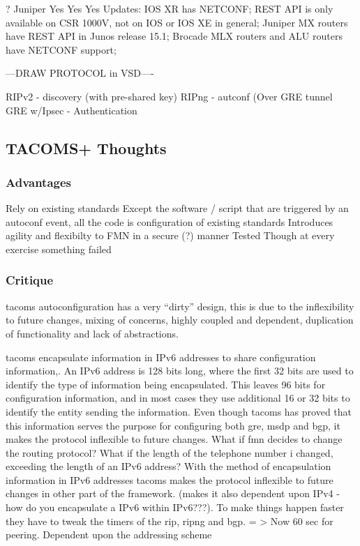 ?
Juniper
Yes
Yes
Yes
Updates:
IOS XR has NETCONF;
REST API is only available on CSR 1000V, not on IOS or IOS XE in general;
Juniper MX routers have REST API in Junos release 15.1;
Brocade MLX routers and ALU routers have NETCONF support;



---DRAW PROTOCOL in VSD----

RIPv2 - discovery (with pre-shared key)
RIPng - autconf (Over GRE tunnel 
GRE w/Ipsec - Authentication

\subsection{TACOMS+ Thoughts}
\subsubsection{Advantages}
Rely on existing standards
Except the software / script that are triggered by an autoconf event, all the code is configuration of existing standards
Introduces agility and flexibilty to FMN in a secure (?) manner
Tested 
Though at every exercise something failed

\subsubsection{Critique}
\gls{tacoms} autoconfiguration has a very “dirty” design, this is due to the inflexibility to future changes, mixing of concerns, highly coupled and dependent, duplication of functionality and lack of abstractions. 

\gls{tacoms} encapsulate information in IPv6 addresses to share configuration information,. An IPv6 address is 128 bits long, where the first 32 bits are used to identify the type of information being encapsulated. This leaves 96 bits for configuration information, and in most cases they use additional 16 or 32 bits to identify the entity sending the information. Even though \gls{tacoms} has proved that this information serves the purpose for configuring both \gls{gre}, \gls{msdp} and \gls{bgp}, it makes the protocol inflexible to future changes. What if \gls{fmn} decides to change the routing protocol? What if the length of the telephone number i changed, exceeding the length of an IPv6 address? With the method of encapsulation information in IPv6 addresses \gls{tacoms} makes the protocol inflexible to future changes in other part of the framework. (makes it also dependent upon IPv4 - how do you encapsulate a IPv6 within IPv6???). 
To make things happen faster they have to tweak the timers of the \gls{rip}, \gls{ripng} and \gls{bgp}.  = > Now 60 sec for peering. 
Dependent upon the addressing scheme

